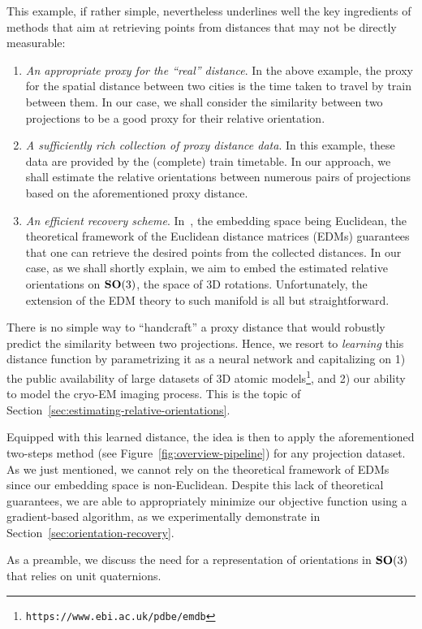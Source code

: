 This example, if rather simple, nevertheless underlines well the key ingredients of methods that aim at retrieving points from distances that may not be directly measurable:
\begin{enumerate}
    \item \textit{An appropriate proxy for the ``real'' distance}. In the above example, the proxy for the spatial distance between two cities is the time taken to travel by train between them. In our case, we shall consider the similarity between two projections to be a good proxy for their relative orientation.
    \item \textit{A sufficiently rich collection of proxy distance data}. In this example, these data are provided by the (complete) train timetable. In our approach, we shall estimate the relative orientations between numerous pairs of projections based on the aforementioned proxy distance.
    \item \textit{An efficient recovery scheme}. In~\cite{dokmanic2015euclidean}, the embedding space being Euclidean, the theoretical framework of the Euclidean distance matrices (EDMs) guarantees that one can retrieve the desired points from the collected distances. In our case, as we shall shortly explain, we aim to embed the estimated relative orientations on $\mathrm{\mathbf{SO}}(3)$, the space of 3D rotations. Unfortunately, the extension of the EDM theory to such manifold is all but straightforward.
\end{enumerate}

There is no simple way to ``handcraft'' a proxy distance that would robustly predict the similarity between two projections. Hence, we resort to \textit{learning} this distance function by parametrizing it as a neural network and capitalizing on 1) the public availability of large datasets of 3D atomic models\footnote{\texttt{https://www.ebi.ac.uk/pdbe/emdb}}, and 2) our ability to model the cryo-EM imaging process. This is the topic of Section~\ref{sec:estimating-relative-orientations}.

Equipped with this learned distance, the idea is then to apply the aforementioned two-steps method (see Figure~\ref{fig:overview-pipeline}) for any projection dataset. As we just mentioned, we cannot rely on the theoretical framework of EDMs since our embedding space is non-Euclidean. Despite this lack of theoretical guarantees, we are able to appropriately minimize our objective function using a gradient-based algorithm, as we experimentally demonstrate in Section~\ref{sec:orientation-recovery}.

As a preamble, we discuss the need for a representation of orientations in $\mathrm{\mathbf{SO}}(3)$ that relies on unit quaternions.
